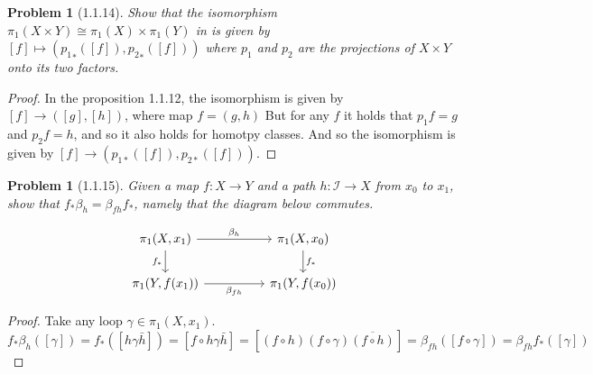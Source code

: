 \documentclass[11pt, a4paper, final]{amsart}
\newcommand{\unit}{\mathcal{I}}
\numberwithin{theorem}{section}
\newtheorem{problem}[theorem]{Problem}
\theoremstyle{definition}
\theoremstyle{remark}
\begin{document}
\begin{problem}[1.1.14]\label{problem: 1.1.14}
    Show that the isomorphism $\pi_1(X \times Y) \cong \pi_1(X) \times \pi_1(Y)$ in \cite[Proposition 1.12]{AH} is given by $[f] \mapsto ({p_1}_*([f]), {p_2}_*([f]))$ where $p_1$ and $p_2$ are the projections of $X \times Y$ onto its two factors.
\end{problem}

\begin{proof}
    In the proposition 1.1.12, the isomorphism is given by $[f] \to ([g], [h])$, where map $f = (g,h)$
    But for any $f$ it holds that $p_1 f  = g$ and $p_2 f = h$, and so it also holds for homotpy classes.
    And so the isomorphism is given by $[f] \to  (p_{1*}([f]), p_{2*}([f]))$.
\end{proof}


\begin{problem}[1.1.15]\label{problem: 1.1.15}
    Given a map $f:X \rightarrow Y$ and a path $h : \unit \rightarrow X$ from $x_0$ to $x_1$, show that $f_*\beta_h = \beta_{fh}f_*$, namely that the diagram below commutes.

    \[\begin{tikzcd}
	{\pi_1(X, x_1)} && {\pi_1(X, x_0)} \\
	{\pi_1(Y, f(x_1))} && {\pi_1(Y, f(x_0))}
	\arrow["{\beta_h}", from=1-1, to=1-3]
	\arrow["{f_*}"', from=1-1, to=2-1]
	\arrow["{f_*}", from=1-3, to=2-3]
	\arrow["{\beta_{fh}}"', from=2-1, to=2-3]
\end{tikzcd}\]
\end{problem}

\begin{proof}
    Take any loop $\gamma \in \pi_1(X, x_1)$.
    $$f_* \beta_h ([\gamma]) = f_*([h\gamma\bar{h}]) = [f\circ h\gamma\bar{h}] = [(f\circ h)(f \circ \gamma)\overline{(f \circ h)}] = \beta_{fh}([f \circ \gamma]) = \beta_{fh}f_*([\gamma])$$
\end{proof}
\end{document}
